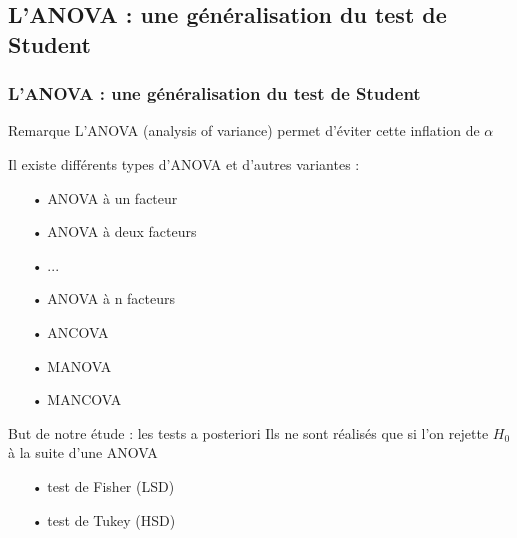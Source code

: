 \documentclass{beamer}
\begin{document}
\subsection{L'ANOVA : une généralisation du test de Student}
\begin{frame}
\frametitle{L'ANOVA : une généralisation du test de Student}
 
\begin{block}{Remarque}
L'ANOVA (analysis of variance) permet d'éviter cette inflation de $\alpha$
\end{block}

Il existe différents types d'ANOVA et d'autres variantes :
\begin{multicols}{2}
\begin{itemize}
\item[•] {ANOVA à un facteur}
\item[•] ANOVA à deux facteurs
\item[•] ...
\item[•] ANOVA à n facteurs
\item[•] ANCOVA
\item[•] MANOVA
\item[•] MANCOVA
\end{itemize}
\end{multicols}

\begin{alertblock}{But de notre étude :  les tests a posteriori}
Ils ne sont réalisés que si l'on rejette $H_0$ à la suite d'une ANOVA
\begin{itemize}
\item[•] test de Fisher (LSD)
\item[•] test de Tukey (HSD)
\end{itemize} 
\end{alertblock}
\end{frame}
\end{document}
